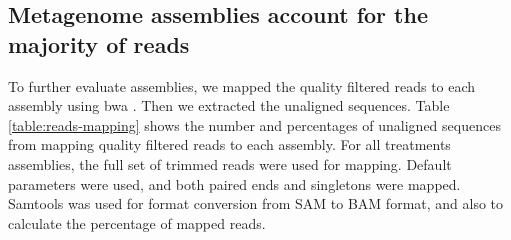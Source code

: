 


%




\subsection*{Metagenome assemblies account for the majority of reads}
To further evaluate assemblies, we mapped the quality filtered reads to each assembly using bwa \cite{bwa-mem}.  Then we extracted the unaligned sequences. Table \ref{table:reads-mapping} shows the number and percentages of unaligned sequences from mapping quality filtered reads to each assembly. For all treatments assemblies, the full set of trimmed reads were used for mapping. Default parameters were used, and both paired ends and singletons were mapped.  Samtools  \cite{samtools} was used for format conversion from SAM to BAM format, and also to calculate the percentage of mapped reads.  


